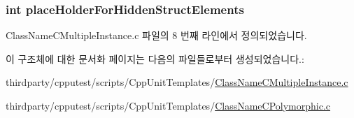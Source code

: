 \subsubsection[{\texorpdfstring{place\+Holder\+For\+Hidden\+Struct\+Elements}{placeHolderForHiddenStructElements}}]{\setlength{\rightskip}{0pt plus 5cm}int place\+Holder\+For\+Hidden\+Struct\+Elements}\hypertarget{struct___class_name_a5705d42d83aa1408a1f19b218cd11502}{}\label{struct___class_name_a5705d42d83aa1408a1f19b218cd11502}


Class\+Name\+C\+Multiple\+Instance.\+c 파일의 8 번째 라인에서 정의되었습니다.



이 구조체에 대한 문서화 페이지는 다음의 파일들로부터 생성되었습니다.\+:\begin{DoxyCompactItemize}
\item 
thirdparty/cpputest/scripts/\+Cpp\+Unit\+Templates/\hyperlink{_cpp_unit_templates_2_class_name_c_multiple_instance_8c}{Class\+Name\+C\+Multiple\+Instance.\+c}\item 
thirdparty/cpputest/scripts/\+Cpp\+Unit\+Templates/\hyperlink{_cpp_unit_templates_2_class_name_c_polymorphic_8c}{Class\+Name\+C\+Polymorphic.\+c}\end{DoxyCompactItemize}
